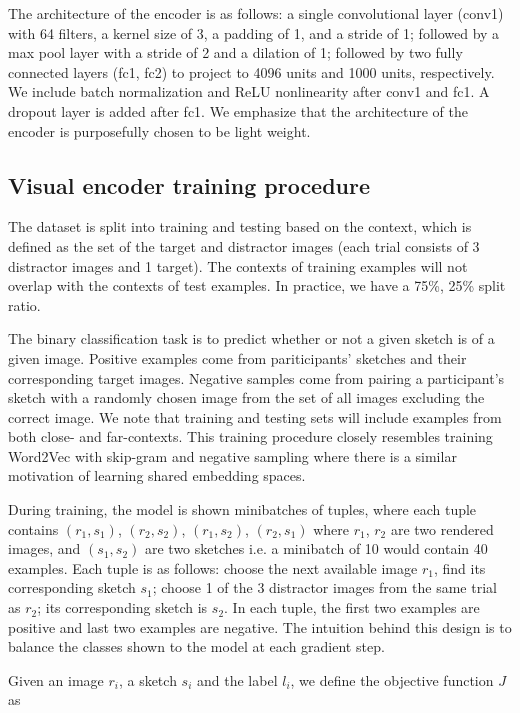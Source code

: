 \documentclass[9pt,twocolumn,twoside]{pnas-new}
\begin{document}
{The architecture of the encoder is as follows: a single convolutional layer (conv1) with 64 filters, a kernel size of 3, a padding of 1, and a stride of 1; followed by a max pool layer with a stride of 2 and a dilation of 1; followed by two fully connected layers (fc1, fc2) to project to 4096 units and 1000 units, respectively. We include batch normalization and ReLU nonlinearity after conv1 and fc1. A dropout layer is added after fc1. We emphasize that the architecture of the encoder is purposefully chosen to be light weight. 


\subsection*{Visual encoder training procedure}

The dataset is split into training and testing based on the context, which is defined as the set of the target and distractor images (each trial consists of 3 distractor images and 1 target). The contexts of training examples will not overlap with the contexts of test examples. In practice, we have a 75\%, 25\% split ratio.

The binary classification task is to predict whether or not a given sketch is of a given image. Positive examples come from pariticipants' sketches and their corresponding target images. Negative samples come from pairing a participant's sketch with a randomly chosen image from the set of all images excluding the correct image. We note that training and testing sets will include examples from both close- and far-contexts. This training procedure closely resembles training Word2Vec with skip-gram and negative sampling where there is a similar motivation of learning shared embedding spaces.

During training, the model is shown minibatches of tuples, where each tuple contains $(r_{1}, s_{1})$, $(r_{2}, s_{2})$, $(r_{1}, s_{2})$, $(r_{2}, s_{1})$ where $r_{1}$, $r_{2}$ are two rendered images, and $(s_{1}, s_{2})$ are two sketches i.e. a minibatch of 10 would contain 40 examples. Each tuple is as follows: choose the next available image $r_{1}$, find its corresponding sketch $s_{1}$; choose 1 of the 3 distractor images from the same trial as $r_{2}$; its corresponding sketch is $s_{2}$. In each tuple, the first two examples are positive and last two examples are negative. The intuition behind this design is to balance the classes shown to the model at each gradient step.

Given an image $r_{i}$, a sketch $s_{i}$ and the label $l_{i}$, we define the objective function $J$ as 

}
\end{document}
